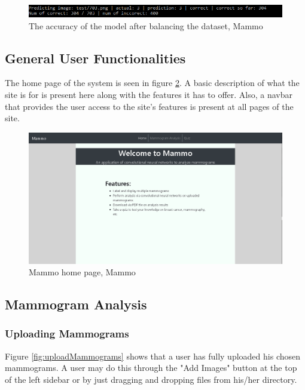 \begin{figure}[h]
	\centering
  	\includegraphics[scale=0.5]{images/secondModelAccuracy.png}
	\caption{The accuracy of the model after balancing the dataset, Mammo}
  	\label{fig:secondModelAccuracy}
\end{figure}
	
\subsection*{General User Functionalities}
\qquad The home page of the system is seen in  figure \ref{fig:mammoHome}. A basic description of what the site is for is present here along with the features it has to offer. Also, a navbar that provides the user access to the site's features is present at all pages of the site.

\begin{figure}[h]
	\centering
  	\includegraphics[scale=0.5]{images/mammoHome.png}
	\caption{Mammo home page, Mammo}
  	\label{fig:mammoHome}
\end{figure}

\subsection{Mammogram Analysis}

\subsubsection{Uploading Mammograms}
\qquad Figure \ref{fig:uploadMammograms} shows that a user has fully uploaded his chosen mammograms. A user may do this through the "Add Images" button at the top of the left sidebar or by just dragging and dropping files from his/her directory.

